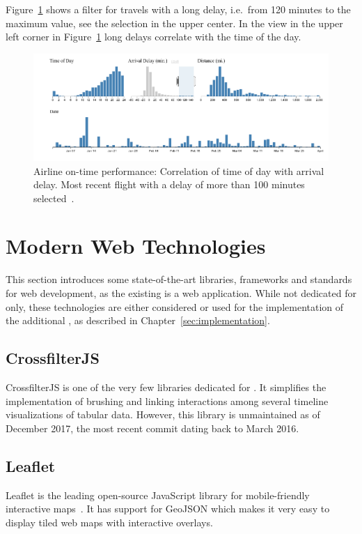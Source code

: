 Figure~\ref{fig:research:brushing-linking} shows a filter for travels with a long delay, i.e.\ from 120 minutes to the maximum value, see the selection in the upper center.
In the view in the upper left corner in Figure~\ref{fig:research:brushing-linking} long delays correlate with the time of the day.

\begin{figure}
  \centering
  \includegraphics[width=\textwidth]{figures/related-work/brushing_linking}
  \caption{Airline on-time performance: Correlation of time of day with arrival delay. Most recent flight with a delay of more than 100 minutes selected~\parencite{Bostock2017}.}
  \label{fig:research:brushing-linking}
\end{figure}

\section{Modern Web Technologies}
This section introduces some state-of-the-art libraries, frameworks and standards for web development, as the existing \visan{} is a web application.
While not dedicated for \cmvs{} only, these technologies are either considered or used for the implementation of the additional \gv{}, as described in Chapter~\ref{sec:implementation}.

\subsection{CrossfilterJS}
CrossfilterJS is one of the very few libraries dedicated for \cmvs{}.
It simplifies the implementation of brushing and linking interactions among several timeline visualizations of tabular data.
However, this library is unmaintained as of December 2017, the most recent commit dating back to March 2016.

\subsection{Leaflet}
Leaflet is the leading open-source JavaScript library for mobile-friendly interactive maps~\parencite{Leaflet2017}.
It has support for GeoJSON which makes it very easy to display tiled web maps with interactive overlays.

